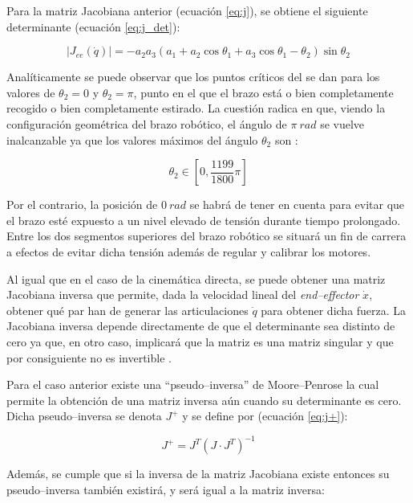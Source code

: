 Para la matriz Jacobiana anterior (ecuación \ref{eq:j}), se obtiene el siguiente
determinante (ecuación \ref{eq:j_det}):

\begin{equation}\label{eq:j_det}
    \left|J_{ee}\left(\dot{q}\right)\right| = - a_{2} a_{3} \left(a_{1} + a_{2} \cos{\theta_{1}} + a_{3} \cos{\theta_{1} - \theta_{2}}\right) \sin{\theta_{2}}
\end{equation}

Analíticamente se puede observar que los puntos críticos del \pArm{} se dan para
los valores de $\theta_2 = 0$ y $\theta_2 = \pi$, punto en el que el brazo está o bien
completamente recogido o bien completamente estirado. La cuestión radica en que, viendo
la configuración geométrica del brazo robótico, el ángulo de $\pi~rad$ se
vuelve inalcanzable ya que los valores máximos del ángulo $\theta_2$ son \cite{UArmDeveloperSwiftProForArduino}:

\begin{equation*}
    \theta_2 \in \left[0, \frac{1199}{1800}\pi\right]
\end{equation*}

Por el contrario, la posición de $0~rad$ se habrá de tener en cuenta para
evitar que el brazo esté expuesto a un nivel elevado de tensión durante tiempo prolongado.
Entre los dos segmentos superiores del brazo robótico se situará un fin de carrera a
efectos de evitar dicha tensión además de regular y calibrar los motores.

Al igual que en el caso de la cinemática directa, se puede obtener una matriz Jacobiana
inversa que permite, dada la velocidad lineal del \textit{end--effector} $\dot{x}$, obtener qué par han
de generar las articulaciones $\dot{q}$ para obtener dicha fuerza. La Jacobiana inversa
depende directamente de que el determinante sea distinto de cero ya que, en otro caso,
implicará que la matriz es una matriz singular y que por consiguiente no es invertible
\cite{InvertibleMatrix2020}.

Para el caso anterior existe una ``pseudo--inversa'' de Moore--Penrose \cite{PseudoinversaMoorePenrose2020}
la cual permite la obtención de una matriz inversa aún cuando su determinante es cero.
Dicha pseudo--inversa se denota $J^+$ y se define por (ecuación \ref{eq:j+}):

\begin{equation}\label{eq:j+}
    J^+ = J^T (J \cdot J^T)^{-1}
\end{equation}

Además, se cumple que si la inversa de la matriz Jacobiana existe entonces su pseudo--inversa
también existirá, y será igual a la matriz inversa:

